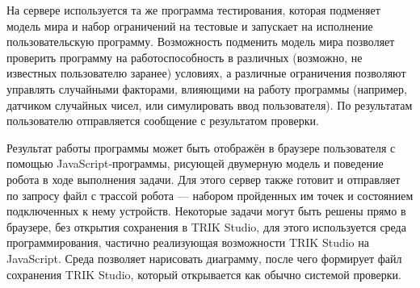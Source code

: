\documentclass[conference]{IEEEtran}
\begin{document}
На сервере используется та же программа тестирования, которая подменяет модель мира 
и набор ограничений на тестовые и запускает на исполнение пользовательскую программу. 
Возможность подменить модель мира позволяет проверить программу на работоспособность 
в различных (возможно, не известных пользователю заранее) условиях, а различные ограничения 
позволяют управлять случайными факторами, влияющими на работу программы (например, 
датчиком случайных чисел, или симулировать ввод пользователя). По результатам пользователю 
отправляется сообщение с результатом проверки.

Результат работы программы может быть отображён в браузере пользователя с помощью 
JavaScript-программы, рисующей двумерную модель и поведение робота в ходе выполнения 
задачи. Для этого сервер также готовит и отправляет по запросу файл с трассой робота 
--- набором пройденных им точек и состоянием подключенных к нему устройств. Некоторые 
задачи могут быть решены прямо в браузере, без открытия сохранения в TRIK Studio, для 
этого используется среда программирования, частично реализующая возможности TRIK Studio 
на JavaScript. Среда позволяет нарисовать диаграмму, после чего формирует файл сохранения 
TRIK Studio, который открывается как обычно системой проверки.
\end{document}
